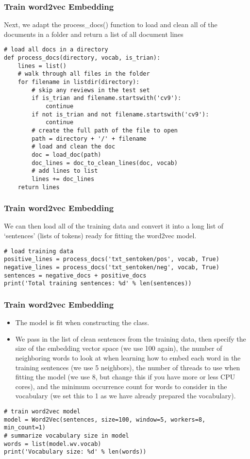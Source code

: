 \begin{frame}[fragile]\frametitle{Train word2vec Embedding}
Next, we adapt the process\_docs() function to load and clean all of the documents in a folder and return a list of all document lines
\begin{lstlisting}
# load all docs in a directory
def process_docs(directory, vocab, is_trian):
	lines = list()
	# walk through all files in the folder
	for filename in listdir(directory):
		# skip any reviews in the test set
		if is_trian and filename.startswith('cv9'):
			continue
		if not is_trian and not filename.startswith('cv9'):
			continue
		# create the full path of the file to open
		path = directory + '/' + filename
		# load and clean the doc
		doc = load_doc(path)
		doc_lines = doc_to_clean_lines(doc, vocab)
		# add lines to list
		lines += doc_lines
	return lines
\end{lstlisting}

\end{frame}

\begin{frame}[fragile]\frametitle{Train word2vec Embedding}
We can then load all of the training data and convert it into a long list of ‘sentences’ (lists of tokens) ready for fitting the word2vec model.
\begin{lstlisting}
# load training data
positive_lines = process_docs('txt_sentoken/pos', vocab, True)
negative_lines = process_docs('txt_sentoken/neg', vocab, True)
sentences = negative_docs + positive_docs
print('Total training sentences: %d' % len(sentences))
\end{lstlisting}

\end{frame}

\begin{frame}[fragile]\frametitle{Train word2vec Embedding}
\begin{itemize}
\item The model is fit when constructing the class. 
\item  We pass in the list of clean sentences from the training data, then specify the size of the embedding vector space (we use 100 again), the number of neighboring words to look at when learning how to embed each word in the training sentences (we use 5 neighbors), the number of threads to use when fitting the model (we use 8, but change this if you have more or less CPU cores), and the minimum occurrence count for words to consider in the vocabulary (we set this to 1 as we have already prepared the vocabulary).
\end{itemize}

\begin{lstlisting}
# train word2vec model
model = Word2Vec(sentences, size=100, window=5, workers=8, min_count=1)
# summarize vocabulary size in model
words = list(model.wv.vocab)
print('Vocabulary size: %d' % len(words))
\end{lstlisting}

\end{frame}

